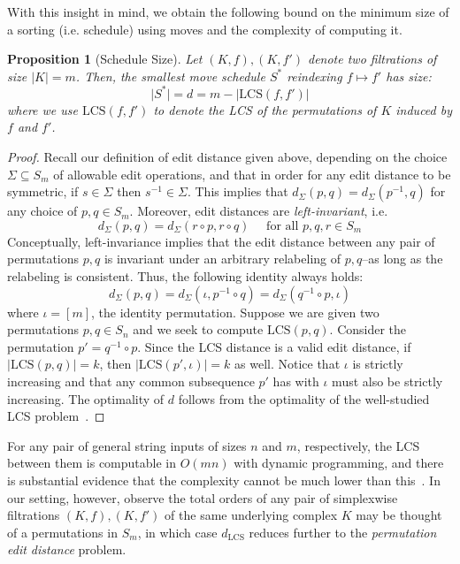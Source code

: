 \documentclass[sn-mathphys]{sn-jnl}
\newtheorem{proposition}{Proposition}
\begin{document}
%
With this insight in mind, we obtain the following bound on the minimum size of a sorting (i.e. schedule) using moves and the complexity of computing it. 
\begin{proposition}[Schedule Size]\label{prop:schedule_size}
Let $(K, f), (K, f')$ denote two filtrations of size $\lvert K \rvert = m$. Then, the smallest move schedule $S^*$ reindexing $f \mapsto f'$ has size: 
$$ \lvert S^\ast \rvert = d = m - \lvert \mathrm{LCS}(f, f') \rvert $$ 
where we use $\mathrm{LCS}(f, f')$ to denote the LCS of the permutations of $K$ induced by $f$ and $f'$.
\end{proposition}
\begin{proof} \normalsize
Recall our definition of  edit distance given above, 
depending on the choice   $\Sigma \subseteq S_m$ of allowable edit operations, and that in order for any edit distance to be symmetric, if $s \in \Sigma$ then $s^{-1} \in \Sigma$. This implies that $d_\Sigma(p,q) = d_\Sigma(p^{-1}, q)$ for any choice of  $p,q \in S_m$. 
Moreover, edit distances are \emph{left-invariant}, i.e.
\[
d_\Sigma(p,q) = d_\Sigma(r \circ p, r \circ q) \quad \text{ for all } p,q,r \in S_m
\]
Conceptually, left-invariance implies that the edit distance between any pair of permutations $p,q$ is invariant under an arbitrary relabeling of $p,q$--as long as the relabeling is consistent. Thus, the following identity always holds: 
$$ d_\Sigma(p,q) = d_\Sigma(\iota, p^{-1} \circ q) = d_\Sigma(q^{-1} \circ p, \iota) $$
where $\iota = [m]$, the identity permutation. Suppose we are given two permutations $p, q \in S_n$ and we seek to compute $\mathrm{LCS}(p, q)$. Consider the permutation $p' = q^{-1} \circ p$. Since the LCS distance is a valid edit distance, if $\lvert \mathrm{LCS}(p, q) \rvert = k$, then $\lvert \mathrm{LCS}(p', \iota) \rvert = k$ as well. Notice that $\iota$ is strictly increasing and that any common subsequence $p'$ has with $\iota$ must also be strictly increasing. The optimality of $d$ follows from the optimality of the well-studied LCS problem~\cite{kumar1987linear}. 
\end{proof}
\noindent
For any pair of general string inputs of sizes $n$ and $m$, respectively, the LCS between them is computable in $O(mn)$ with dynamic programming, and there is substantial evidence that the complexity cannot be much lower than this~\cite{abboud2015tight}. 
In our setting, however, observe the total orders of any pair of simplexwise filtrations $(K, f), (K, f')$ of the same underlying complex $K$ may be thought of a permutations in $S_m$, in which case $d_{\mathrm{LCS}}$ reduces further to the \emph{permutation edit distance} problem. 
\end{document}
